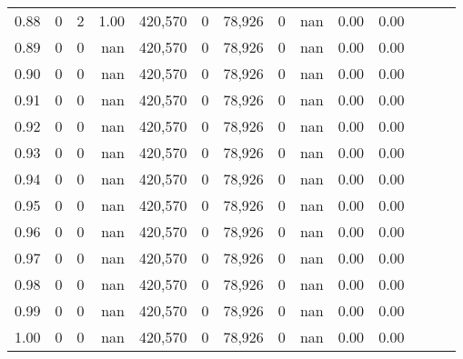 \begin{tabular}{rrrrrrrrrrrrrr}
0.88 &       0 &      2 &  1.00 &  420,570 &        0 &  78,926 &       0 &   nan &  0.00 &      0.00 \\
0.89 &       0 &      0 &   nan &  420,570 &        0 &  78,926 &       0 &   nan &  0.00 &      0.00 \\
0.90 &       0 &      0 &   nan &  420,570 &        0 &  78,926 &       0 &   nan &  0.00 &      0.00 \\
0.91 &       0 &      0 &   nan &  420,570 &        0 &  78,926 &       0 &   nan &  0.00 &      0.00 \\
0.92 &       0 &      0 &   nan &  420,570 &        0 &  78,926 &       0 &   nan &  0.00 &      0.00 \\
0.93 &       0 &      0 &   nan &  420,570 &        0 &  78,926 &       0 &   nan &  0.00 &      0.00 \\
0.94 &       0 &      0 &   nan &  420,570 &        0 &  78,926 &       0 &   nan &  0.00 &      0.00 \\
0.95 &       0 &      0 &   nan &  420,570 &        0 &  78,926 &       0 &   nan &  0.00 &      0.00 \\
0.96 &       0 &      0 &   nan &  420,570 &        0 &  78,926 &       0 &   nan &  0.00 &      0.00 \\
0.97 &       0 &      0 &   nan &  420,570 &        0 &  78,926 &       0 &   nan &  0.00 &      0.00 \\
0.98 &       0 &      0 &   nan &  420,570 &        0 &  78,926 &       0 &   nan &  0.00 &      0.00 \\
0.99 &       0 &      0 &   nan &  420,570 &        0 &  78,926 &       0 &   nan &  0.00 &      0.00 \\
1.00 &       0 &      0 &   nan &  420,570 &        0 &  78,926 &       0 &   nan &  0.00 &      0.00 \\
\bottomrule
\end{tabular}
